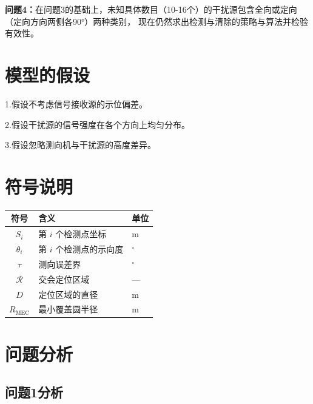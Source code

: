\documentclass[withoutpreface,bwprint]{cumcmthesis} %
\newcommand{\MEC}{\operatorname{MEC}}
\begin{document}
\textbf{问题4：}在问题3的基础上，未知具体数目（10-16个）的干扰源包含全向或定向（定向方向两侧各90°）两种类别，
现在仍然求出检测与清除的策略与算法并检验有效性。
\section{模型的假设}
1.假设不考虑信号接收源的示位偏差。

2.假设干扰源的信号强度在各个方向上均匀分布。

3.假设忽略测向机与干扰源的高度差异。

\section{符号说明}
\begin{table}[htbp]
\centering
\begin{tabular}{cll}
\toprule
符号 & 含义 & 单位 \\
\midrule
$S_i$ & 第 $i$ 个检测点坐标 & m \\
$\theta_i$ & 第 $i$ 个检测点的示向度 & $^\circ$ \\
$\tau$ & 测向误差界 & $^\circ$ \\
$\mathcal R$ & 交会定位区域 & --- \\
$D$ & 定位区域的直径 & m \\
$R_{\MEC}$ & 最小覆盖圆半径 & m \\
\bottomrule
\end{tabular}
\end{table}
\section{问题分析}
\subsection{问题1分析}
\end{document}
